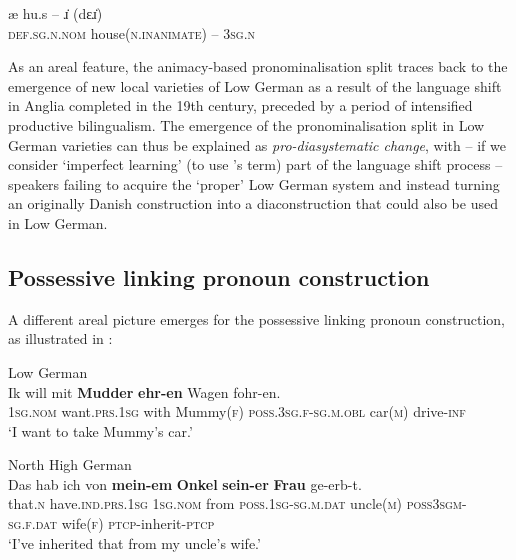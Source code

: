 \documentclass[output=paper]{langsci/langscibook}
\begin{document}
	\ex\label{ex:hoeder:14e}	
	\gll æ hu.s – ɹ̇ (dɛɹ̇)\\
     \textsc{def.sg.n.nom}{} house(\textsc{n.inanimate}) – 3\textsc{sg.n}\\
\z
\z

As an areal feature, the animacy-based pronominalisation split traces back to the emergence of new local varieties of Low German as a result of the language shift in Anglia completed in the 19th century, preceded by a period of intensified productive bilingualism. The{} emergence of the pronominalisation split in Low German varieties can thus be explained as \textit{pro-diasystematic change}, with – if we consider ‘imperfect learning’ (to use \citeauthor{Thomason.1988}'s \citeyear{Thomason.1988} term) part of the language shift process – speakers failing to acquire the ‘proper’ Low German system and instead turning an originally Danish construction into a diaconstruction that could also be used in Low German.


 
\subsection{Possessive linking pronoun construction}\label{sec:hoeder:4.5}


A different areal picture emerges for the possessive linking pronoun construction, as illustrated in :
 
\ea\label{ex:hoeder:15}
	\ea\label{ex:hoeder:15a}
	Low German\\
	\gll Ik will mit \textbf{Mudder}{ }\textbf{ehr-en} Wagen fohr-en.\\
     \textsc{1sg.nom}{} want.\textsc{prs.1sg} with Mummy(\textsc{f}) \textsc{poss.3sg.f-sg.m.obl} car(\textsc{m}) drive-\textsc{inf}\\
	\glt `I want to take Mummy’s car.'

	\ex\label{ex:hoeder:15b}
	North High German\\
	\gll Das hab ich von \textbf{mein-em} \textbf{Onkel} \textbf{sein-er} \textbf{Frau} ge-erb-t.\\
     that.\textsc{n} have.\textsc{ind.prs.1sg} \textsc{1sg.nom}{} from \textsc{poss.1sg-sg.m.dat} uncle(\textsc{m}) \textsc{poss3sgm-sg.f.dat} wife(\textsc{f}) \textsc{ptcp-}inherit-\textsc{ptcp}\\
	\glt `I’ve inherited that from my uncle’s wife.'
\z
\z
\end{document}
